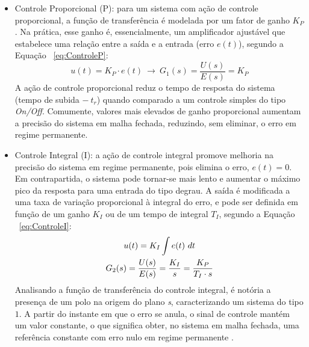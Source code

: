 \begin{itemize}
    \item Controle Proporcional (P): para um sistema com ação de controle proporcional, a função de transferência é modelada por um fator de ganho $K_P$. Na prática, esse ganho é, essencialmente, um amplificador ajustável que estabelece uma relação entre a saída e a entrada (erro $e(t)$), segundo a Equação ~\ref{eq:ControleP}:
         \begin{equation}
            \label{eq:ControleP}
            u(t) = K_P \cdot e(t) \ \rightarrow \ G_1(s) = \dfrac{U(s)}{E(s)} = K_P 
        \end{equation}
    A ação de controle proporcional reduz o tempo de resposta do sistema (tempo de subida $- \ t_r$) quando comparado a um controle simples do tipo \textit{On/Off}. Comumente, valores mais elevados de ganho proporcional aumentam a precisão do sistema em malha fechada, reduzindo, sem eliminar, o erro em regime permanente.
       
    \item Controle Integral (I): a ação de controle integral promove melhoria na precisão do sistema em regime permanente, pois elimina o erro, $e(t)=0$. Em contrapartida, o sistema pode tornar-se mais lento e aumentar o máximo pico da resposta para uma entrada do tipo degrau. A saída é modificada a uma taxa de variação proporcional à integral do erro, e pode ser definida em função de um ganho $K_I$ ou de um tempo de integral $T_I$, segundo a Equação ~\ref{eq:ControleI}:
    \begin{equation}
        \label{eq:ControleI}
        \centering
        \begin{gathered}
            u(t) = K_I \int  e(t) \ dt \\
            G_2(s) = \dfrac{U(s)}{E(s)} = \frac{K_I}{s} = \dfrac{K_P}{T_I \cdot s}
        \end{gathered}
    \end{equation}
    Analisando a função de transferência do controle integral, é notória a presença de um polo na origem do plano \textit{s}, caracterizando um sistema do tipo $1$. A partir do instante em que o erro se anula, o sinal de controle mantém um valor constante, o que significa obter, no sistema em malha fechada, uma referência constante com erro nulo em regime permanente \cite{Enciclopedia_Automatica}.
        

\end{itemize}

